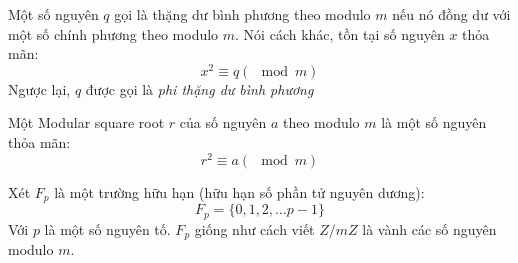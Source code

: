 \begin{definition}
	Một số nguyên $q$ gọi là thặng dư bình phương theo modulo $m$ nếu nó đồng dư với một số chính phương theo modulo $m$.
	Nói cách khác, tồn tại số nguyên $x$ thỏa mãn:
	$$x^2 \equiv q (\mod{m})$$
	Ngược lại, $q$ được gọi là \textit{phi thặng dư bình phương}

\end{definition}

\begin{definition}
	Một Modular square root $r$ của số nguyên $a$ theo modulo $m$ là một số nguyên thỏa mãn:
	$$r^2 \equiv a (\mod{m})$$
\end{definition}

Xét $F_p$ là một trường hữu hạn (hữu hạn số phần tử nguyên dương):
$$F_p = \{0, 1, 2, \ldots p-1\}$$
Với $p$ là một số nguyên tố. $F_p$ giống như cách viết $Z/mZ$ là vành các số nguyên modulo $m$.



